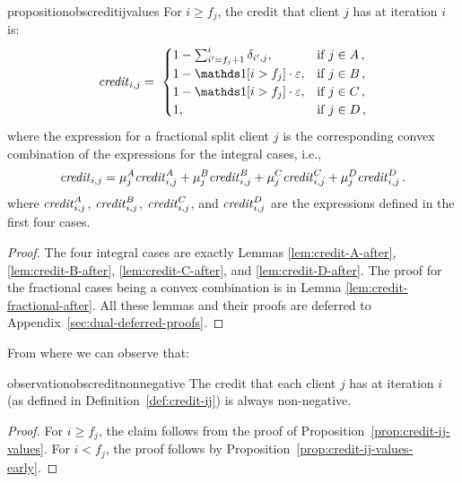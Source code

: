 \begin{restatable}{proposition}{obscreditijvalues}\label{prop:credit-ij-values}
    For $i \geq f_j$, the credit that client $j$ has at iteration $i$ is:
    \begin{equation*}
        \text{\emph{credit}}_{i,j} = 
        \ \begin{cases}
            1 - \sum_{i'=f_j+1}^i \delta_{i',j},
            & \text{if $j \in A$}\,,\\
            1 - \ind[i > f_j] \cdot \Mcoeffmone,
            & \text{if $j \in B$}\,,\\
            1 - \ind[i > f_j] \cdot \Mcoeffmone,
            & \text{if $j \in C$}\,,\\
            1,
            & \text{if $j \in D$}\,,\\
        \end{cases}
    \end{equation*}
    where the expression for a fractional split client $j$ is the corresponding convex combination of the expressions for the integral cases, i.e.,
    \begin{equation*}
        \text{\emph{credit}}_{i,j}
        = \mu_j^A \text{\emph{credit}}_{i,j}^A
        + \mu_j^B \text{\emph{credit}}_{i,j}^B
        + \mu_j^C \text{\emph{credit}}_{i,j}^C
        + \mu_j^D \text{\emph{credit}}_{i,j}^D\,.
    \end{equation*}
    where $\text{\emph{credit}}_{i,j}^A$, $\text{\emph{credit}}_{i,j}^B$, $\text{\emph{credit}}_{i,j}^C$, and $\text{\emph{credit}}_{i,j}^D$ are the expressions defined in the first four cases.
\end{restatable}
\begin{proof}
The four integral cases are exactly Lemmas \ref{lem:credit-A-after}, \ref{lem:credit-B-after}, \ref{lem:credit-C-after}, and \ref{lem:credit-D-after}. The proof for the fractional cases being a convex combination is in Lemma \ref{lem:credit-fractional-after}. All these lemmas and their proofs are deferred to Appendix~\ref{sec:dual-deferred-proofs}.
\end{proof}
From where we can observe that:
\begin{restatable}{observation}{obscreditnonnegative}\label{obs:credit-non-negative}
    The credit that each client $j$ has at iteration $i$ (as defined in Definition~\ref{def:credit-ij}) is always non-negative.
\end{restatable}
\begin{proof}
For $i \geq f_j$, the claim follows from the proof of Proposition~\ref{prop:credit-ij-values}.
For $i < f_j$, the proof follows by Proposition~\ref{prop:credit-ij-values-early}.
\end{proof}
